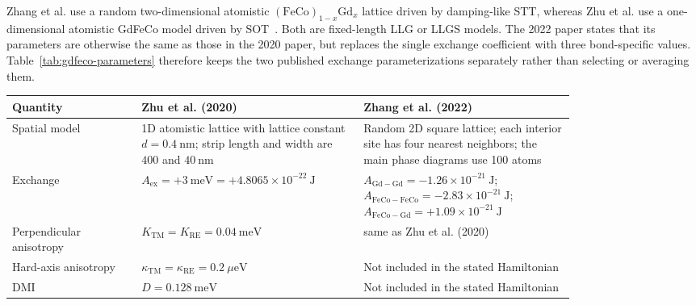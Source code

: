 Zhang et al. use a random two-dimensional atomistic
$(\mathrm{FeCo})_{1-x}\mathrm{Gd}_x$ lattice driven by damping-like STT,
whereas Zhu et al. use a one-dimensional atomistic GdFeCo model driven by
SOT~\cite{zhang2022spatially,zhu2020terahertz}.  Both are fixed-length LLG or
LLGS models.  The 2022 paper states that its parameters are otherwise the same
as those in the 2020 paper, but replaces the single exchange coefficient with
three bond-specific values.  Table~\ref{tab:gdfeco-parameters} therefore keeps
the two published exchange parameterizations separately rather than selecting
or averaging them.

\begin{table}[htbp]
    \centering
    \small
    \renewcommand{\arraystretch}{1.15}
    \begin{tabular}{p{0.19\linewidth}p{0.31\linewidth}p{0.31\linewidth}}
        \hline
        Quantity & Zhu et al. (2020)                                                & Zhang et al. (2022) \\
        \hline
        Spatial model
                 & 1D atomistic lattice with lattice constant $d=0.4\ \mathrm{nm}$;
        strip length and width are $400$ and $40\ \mathrm{nm}$
                 & Random 2D square lattice; each interior site has four nearest
        neighbors; the main phase diagrams use 100 atoms                                                  \\
        Exchange
                 & $A_{\mathrm{ex}}=+3\ \mathrm{meV}
                       =+4.8065\times10^{-22}\ \mathrm{J}$
                 & $A_{\mathrm{Gd-Gd}}=-1.26\times10^{-21}\ \mathrm{J}$;
        $A_{\mathrm{FeCo-FeCo}}=-2.83\times10^{-21}\ \mathrm{J}$;
        $A_{\mathrm{FeCo-Gd}}=+1.09\times10^{-21}\ \mathrm{J}$                                            \\
        Perpendicular anisotropy
                 & $K_{\mathrm{TM}}=K_{\mathrm{RE}}=0.04\ \mathrm{meV}$
                 & same as Zhu et al. (2020)                                                              \\
        Hard-axis anisotropy
                 & $\kappa_{\mathrm{TM}}=\kappa_{\mathrm{RE}}=0.2\ \mu\mathrm{eV}$
                 & Not included in the stated Hamiltonian                                                 \\
        DMI
                 & $D=0.128\ \mathrm{meV}$
                 & Not included in the stated Hamiltonian                                                 \\

\end{tabular}
\end{table}
